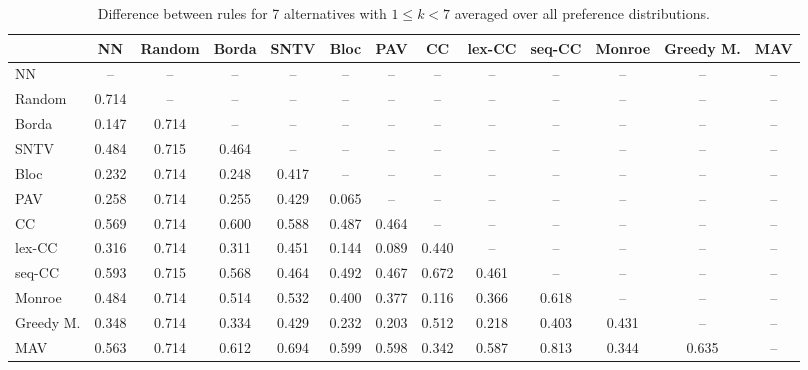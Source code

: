 
\begin{table*}[h!]
\centering
\begin{tabular}{lcccccccccccc}
\toprule
 & NN & Random & Borda & SNTV & Bloc & PAV & CC & lex-CC & seq-CC & Monroe & Greedy M. & MAV \\
\midrule
NN & -- & -- & -- & -- & -- & -- & -- & -- & -- & -- & -- & -- \\
Random & 0.714 & -- & -- & -- & -- & -- & -- & -- & -- & -- & -- & -- \\
Borda & 0.147 & 0.714 & -- & -- & -- & -- & -- & -- & -- & -- & -- & -- \\
SNTV & 0.484 & 0.715 & 0.464 & -- & -- & -- & -- & -- & -- & -- & -- & -- \\
Bloc & 0.232 & 0.714 & 0.248 & 0.417 & -- & -- & -- & -- & -- & -- & -- & -- \\
PAV & 0.258 & 0.714 & 0.255 & 0.429 & 0.065 & -- & -- & -- & -- & -- & -- & -- \\
CC & 0.569 & 0.714 & 0.600 & 0.588 & 0.487 & 0.464 & -- & -- & -- & -- & -- & -- \\
lex-CC & 0.316 & 0.714 & 0.311 & 0.451 & 0.144 & 0.089 & 0.440 & -- & -- & -- & -- & -- \\
seq-CC & 0.593 & 0.715 & 0.568 & 0.464 & 0.492 & 0.467 & 0.672 & 0.461 & -- & -- & -- & -- \\
Monroe & 0.484 & 0.714 & 0.514 & 0.532 & 0.400 & 0.377 & 0.116 & 0.366 & 0.618 & -- & -- & -- \\
Greedy M. & 0.348 & 0.714 & 0.334 & 0.429 & 0.232 & 0.203 & 0.512 & 0.218 & 0.403 & 0.431 & -- & -- \\
MAV & 0.563 & 0.714 & 0.612 & 0.694 & 0.599 & 0.598 & 0.342 & 0.587 & 0.813 & 0.344 & 0.635 & -- \\
\bottomrule
\end{tabular}

\caption{Difference between rules for 7 alternatives with $1 \leq k < 7$ averaged over all preference distributions.}
\end{table*}
